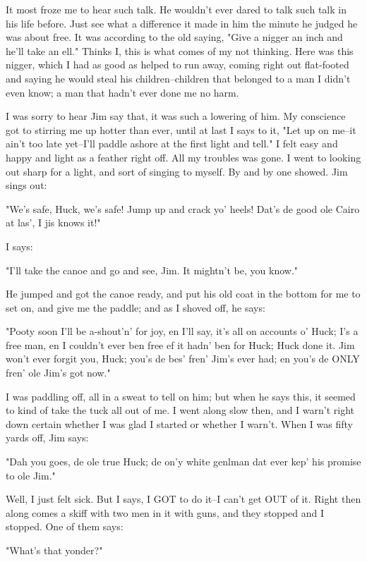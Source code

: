 It most froze me to hear such talk.  He wouldn't ever dared to talk such
talk in his life before.  Just see what a difference it made in him the
minute he judged he was about free.  It was according to the old saying,
"Give a nigger an inch and he'll take an ell."  Thinks I, this is what
comes of my not thinking.  Here was this nigger, which I had as good as
helped to run away, coming right out flat-footed and saying he would
steal his children--children that belonged to a man I didn't even know; a
man that hadn't ever done me no harm.

I was sorry to hear Jim say that, it was such a lowering of him.  My
conscience got to stirring me up hotter than ever, until at last I says
to it, "Let up on me--it ain't too late yet--I'll paddle ashore at the
first light and tell."  I felt easy and happy and light as a feather
right off.  All my troubles was gone.  I went to looking out sharp for a
light, and sort of singing to myself.  By and by one showed.  Jim sings
out:

"We's safe, Huck, we's safe!  Jump up and crack yo' heels!  Dat's de good
ole Cairo at las', I jis knows it!"

I says:

"I'll take the canoe and go and see, Jim.  It mightn't be, you know."

He jumped and got the canoe ready, and put his old coat in the bottom for
me to set on, and give me the paddle; and as I shoved off, he says:

"Pooty soon I'll be a-shout'n' for joy, en I'll say, it's all on accounts
o' Huck; I's a free man, en I couldn't ever ben free ef it hadn' ben for
Huck; Huck done it.  Jim won't ever forgit you, Huck; you's de bes' fren'
Jim's ever had; en you's de ONLY fren' ole Jim's got now."

I was paddling off, all in a sweat to tell on him; but when he says this,
it seemed to kind of take the tuck all out of me.  I went along slow
then, and I warn't right down certain whether I was glad I started or
whether I warn't.  When I was fifty yards off, Jim says:

"Dah you goes, de ole true Huck; de on'y white genlman dat ever kep' his
promise to ole Jim."

Well, I just felt sick.  But I says, I GOT to do it--I can't get OUT of
it.  Right then along comes a skiff with two men in it with guns, and
they stopped and I stopped.  One of them says:

"What's that yonder?"

